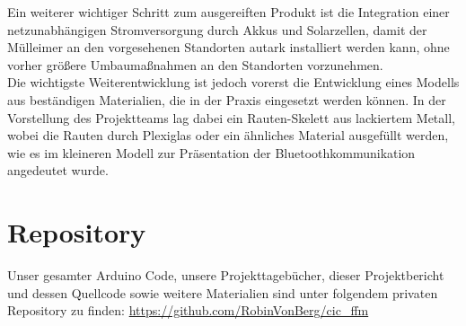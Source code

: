     Ein weiterer wichtiger Schritt zum ausgereiften Produkt ist die Integration einer netzunabhängigen Stromversorgung durch Akkus und Solarzellen, damit der Mülleimer an den vorgesehenen Standorten autark installiert werden kann, ohne vorher größere Umbaumaßnahmen an den Standorten vorzunehmen.\\

    Die wichtigste Weiterentwicklung ist jedoch vorerst die Entwicklung eines Modells aus beständigen Materialien, die in der Praxis eingesetzt werden können. In der Vorstellung des Projektteams lag dabei ein Rauten-Skelett aus lackiertem Metall, wobei die Rauten durch Plexiglas oder ein ähnliches Material ausgefüllt werden, wie es im kleineren Modell zur Präsentation der Bluetoothkommunikation angedeutet wurde.

\chapter{Repository}

    Unser gesamter Arduino Code, unsere Projekttagebücher, dieser Projektbericht und dessen Quellcode sowie weitere Materialien sind unter folgendem privaten Repository zu finden: \url{https://github.com/RobinVonBerg/cic_ffm}

    